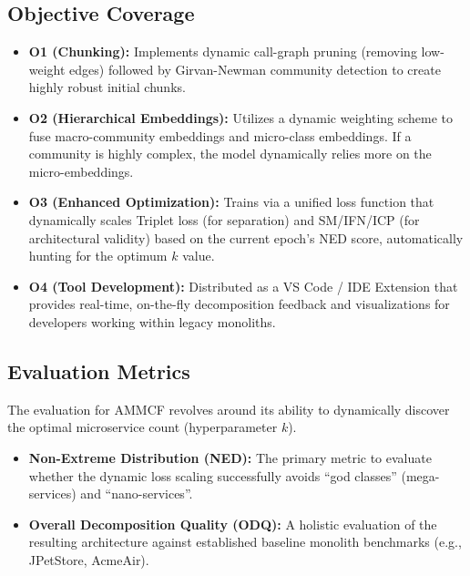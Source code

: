 \documentclass[12pt, a4paper]{article}
\begin{document}
\subsection{Objective Coverage}
\begin{itemize}
    \item \textbf{O1 (Chunking):} Implements dynamic call-graph pruning (removing low-weight edges) followed by Girvan-Newman community detection to create highly robust initial chunks.
    \item \textbf{O2 (Hierarchical Embeddings):} Utilizes a dynamic weighting scheme to fuse macro-community embeddings and micro-class embeddings. If a community is highly complex, the model dynamically relies more on the micro-embeddings.
    \item \textbf{O3 (Enhanced Optimization):} Trains via a unified loss function that dynamically scales Triplet loss (for separation) and SM/IFN/ICP (for architectural validity) based on the current epoch's NED score, automatically hunting for the optimum $k$ value.
    \item \textbf{O4 (Tool Development):} Distributed as a VS Code / IDE Extension that provides real-time, on-the-fly decomposition feedback and visualizations for developers working within legacy monoliths.
\end{itemize}

\subsection{Evaluation Metrics}
The evaluation for AMMCF revolves around its ability to dynamically discover the optimal microservice count (hyperparameter $k$).
\begin{itemize}
    \item \textbf{Non-Extreme Distribution (NED):} The primary metric to evaluate whether the dynamic loss scaling successfully avoids ``god classes'' (mega-services) and ``nano-services''.
    \item \textbf{Overall Decomposition Quality (ODQ):} A holistic evaluation of the resulting architecture against established baseline monolith benchmarks (e.g., JPetStore, AcmeAir).
\end{itemize}
\end{document}
